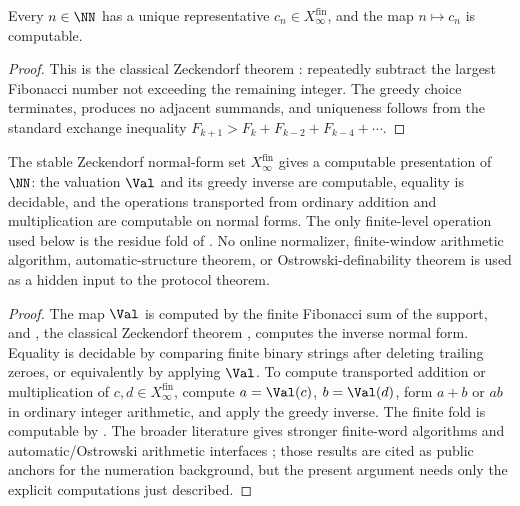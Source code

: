 \begin{lemma}
\label{lem:greedy-zeckendorf-normalizer}
Every \(n\in\NN\) has a unique representative \(c_n\in
X_\infty^{\mathrm{fin}}\), and the map \(n\mapsto c_n\) is computable.
\end{lemma}

\begin{proof}
This is the classical Zeckendorf theorem \cite{Zeckendorf1972}: repeatedly
subtract the largest Fibonacci number not exceeding the remaining integer.  The
greedy choice terminates, produces no adjacent summands, and uniqueness follows
from the standard exchange inequality
\(F_{k+1}>F_k+
F_{k-2}+F_{k-4}+\cdots\).
\end{proof}

\begin{proposition}
\label{prop:zeckendorf-computable-arithmetic-anchor}
The stable Zeckendorf normal-form set \(X_\infty^{\mathrm{fin}}\) gives a
computable presentation of \(\NN\): the valuation \(\Val\) and its greedy inverse
are computable, equality is decidable, and the operations transported from
ordinary addition and multiplication are computable on normal forms.  The only
finite-level operation used below is the residue fold of .  No
online normalizer, finite-window arithmetic algorithm, automatic-structure
theorem, or Ostrowski-definability theorem is used as a hidden input to the
protocol theorem.
\end{proposition}

\begin{proof}
The map \(\Val\) is computed by the finite Fibonacci sum of the support, and
, the classical Zeckendorf theorem
\cite{Zeckendorf1972}, computes the inverse normal form.  Equality is decidable
by comparing finite binary strings after deleting trailing zeroes, or
equivalently by applying \(\Val\).  To compute transported addition or
multiplication of \(c,d\in X_\infty^{\mathrm{fin}}\), compute
\(a=\Val(c)\), \(b=\Val(d)\), form \(a+b\) or \(ab\) in ordinary integer
arithmetic, and apply the greedy inverse.  The finite fold is computable by
.  The broader literature gives
stronger finite-word algorithms and automatic/Ostrowski arithmetic interfaces
\cite{AhlbachEtAl2013,HieronymiTerry2018}; those results are cited as public
anchors for the numeration background, but the present argument needs only the
explicit computations just described.
\end{proof}

